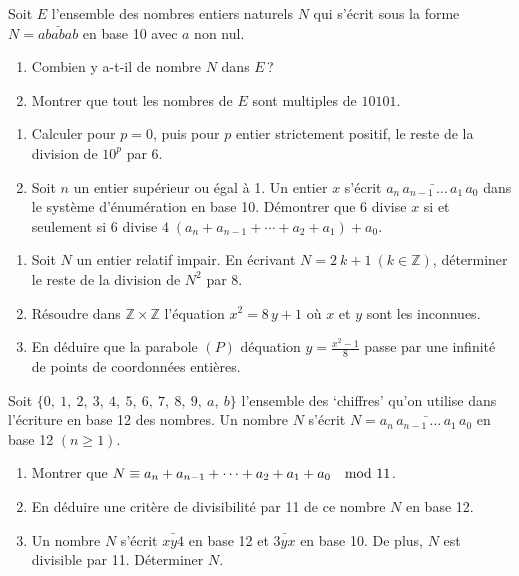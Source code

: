 %
\begin{exo}
      Soit $E$ l'ensemble des nombres entiers naturels $N$ qui s'\'ecrit 
      sous la forme $N = \bar{ababab}$ en base 10 avec $a$ non nul.
      \begin{enumerate}
            \item Combien y a-t-il de nombre $N$ dans $E$\,? 
            \item Montrer que tout les nombres de $E$ sont multiples de $10101$.
      \end{enumerate}
\end{exo}
%
\begin{exo}
      \begin{enumerate}
            \item Calculer pour $p = 0$, puis pour $p$ entier strictement positif, le reste de la division de $10^p$ par 6.
            \item Soit $n$ un entier sup\'erieur ou \'egal \`a 1. 
                  Un entier $x$ s'\'ecrit $\bar{a_n \, a_{n-1} \, \dots \, a_1 \, a_0} $ 
                  dans le syst\`eme d'\'enum\'eration en base 10.
                  D\'emontrer que 6 divise $x$ si et seulement si 6 divise $4 \; (a_n + a_{n-1} + \cdots + a_2 + a_1 ) + a_0$.
      \end{enumerate}
\end{exo}
%
\begin{exo}
      \begin{enumerate}
            \item Soit $N$ un entier relatif impair. 
                  En \'ecrivant $N = 2\ k + 1 \ (k \in \mathbb{Z})$, d\'eterminer le reste de la division de $N^2$ par 8.
            \item R\'esoudre dans $\mathbb{Z} \times \mathbb{Z}$ 
                  l'\'equation $x^2 = 8 \, y + 1$ o\`u $x$ et $y$ sont les inconnues. 
            \item En d\'eduire que la parabole $(P)$ d\'equation $y = \frac{x^2 - 1}{8}$ 
                  passe par une infinit\'e de points de coordonn\'ees enti\`eres.
      \end{enumerate}
\end{exo}
%
\begin{exo}
      Soit $\{0,\ 1,\ 2,\ 3,\ 4,\ 5,\ 6,\ 7,\ 8,\ 9,\ a,\ b \}$ 
      l'ensemble des `chiffres' qu'on utilise dans l'\'ecriture en base 12 des nombres.
      Un nombre $N$ s'\'ecrit $N = \bar{a_n \, a_{n-1} \, \dots \, a_1 \, a_0}$ en base 12 $(n \geq 1)$.
      \begin{enumerate}
            \item Montrer que $N \equiv a_n + a_{n-1} + \cdots + a_2 + a_1  + a_0 \quad \mathrm{mod}\ 11$.
            \item En d\'eduire une crit\`ere de divisibilit\'e par 11 de ce nombre $N$ en base 12.
            \item Un nombre $N$ s'\'ecrit $\bar{xy4}$ en base 12 et $\bar{3yx}$ en base 10.
                  De plus, $N$ est divisible par 11.
                  D\'eterminer $N$.
      \end{enumerate}
\end{exo}
